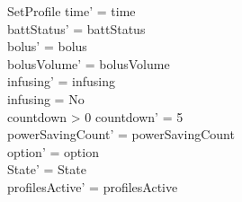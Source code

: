\begin{schema}{SetProfile}
	time' = time\\
	battStatus' = battStatus\\
	bolus' = bolus\\
	bolusVolume' = bolusVolume\\
	infusing' = infusing\\
	infusing = No\\
	countdown > 0 \land countdown' = 5\\
	powerSavingCount' = powerSavingCount\\ 
	option' = option\\
	State' = State\\
	profilesActive' = profilesActive\\  
	 
\end{schema}

